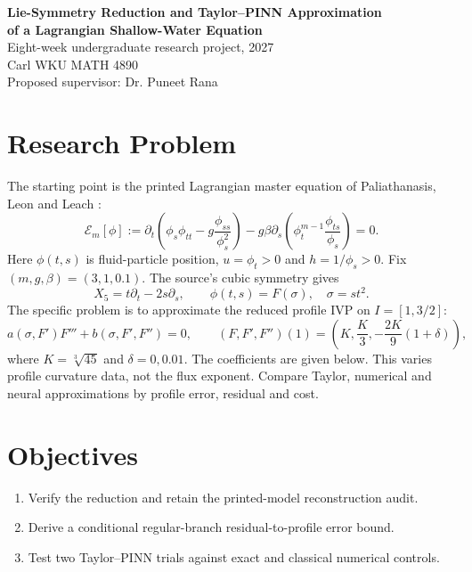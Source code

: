 \documentclass[12pt,a4paper]{article}
\newcommand{\E}{\mathcal E}
\begin{document}
\begin{center}
\textbf{Lie-Symmetry Reduction and Taylor--PINN Approximation\\
of a Lagrangian Shallow-Water Equation}\\
Eight-week undergraduate research project, 2027\\
Carl \quad WKU MATH 4890\\
Proposed supervisor: Dr. Puneet Rana
\end{center}

\section{Research Problem}
The starting point is the printed Lagrangian master equation of Paliathanasis, Leon and Leach \cite{lagrange}:
\begin{equation}
\E_m[\phi]:=
\partial_t\left(\phi_s\phi_{tt}-g\frac{\phi_{ss}}{\phi_s^2}\right)
-g\beta\partial_s\left(\phi_t^{m-1}\frac{\phi_{ts}}{\phi_s}\right)=0.
\label{eq:master}
\end{equation}
Here $\phi(t,s)$ is fluid-particle position, $u=\phi_t>0$ and $h=1/\phi_s>0$. Fix $(m,g,\beta)=(3,1,0.1)$. The source's cubic symmetry gives
\[
X_5=t\partial_t-2s\partial_s,\qquad \phi(t,s)=F(\sigma),\quad \sigma=st^2.
\]
The specific problem is to approximate the reduced profile IVP on $I=[1,3/2]$:
\begin{equation}
a(\sigma,F')F'''+b(\sigma,F',F'')=0,\qquad
(F,F',F'')(1)=\left(K,\frac K3,-\frac{2K}{9}(1+\delta)\right),
\label{eq:problem}
\end{equation}
where $K=\sqrt[3]{45}$ and $\delta=0,0.01$. The coefficients are given below. This varies profile curvature data, not the flux exponent. Compare Taylor, numerical and neural approximations by profile error, residual and cost.

\section{Objectives}
\begin{enumerate}
\item Verify the reduction and retain the printed-model reconstruction audit.
\item Derive a conditional regular-branch residual-to-profile error bound.
\item Test two Taylor--PINN trials against exact and classical numerical controls.
\end{enumerate}
\end{document}
